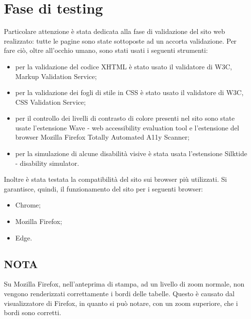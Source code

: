 \section{Fase di testing}
Particolare attenzione è stata dedicata alla fase di validazione del sito web realizzato: tutte le pagine sono state sottoposte ad un accorta validazione. Per fare ciò, oltre all'occhio umano, sono stati usati i seguenti strumenti: 
\begin{itemize}
	\item per la validazione del codice XHTML è stato usato il validatore di W3C, Markup Validation Service;
	\item per la validazione dei fogli di stile in CSS è stato usato il validatore di W3C, CSS Validation Service;
	\item per il controllo dei livelli di contrasto di colore presenti nel sito sono state usate l'estensione Wave - web accessibility evaluation tool e l'estensione del browser Mozilla Firefox Totally Automated A11y Scanner;
	\item per la simulazione di alcune disabilità visive è stata usata l'estensione Silktide - disability simulator.
\end{itemize}
Inoltre è stata testata la compatibilità del sito sui browser più utilizzati. Si garantisce, quindi, il funzionamento del sito per i seguenti browser:
\begin{itemize}
\item Chrome;
\item Mozilla Firefox;
\item Edge.
\end{itemize}
\subsection{NOTA}Su Mozilla Firefox, nell'anteprima di stampa, ad un livello di zoom normale, non vengono renderizzati correttamente i bordi delle tabelle. Questo è causato dal visualizzatore di Firefox, in quanto si può notare, con un zoom superiore, che i bordi sono corretti.  